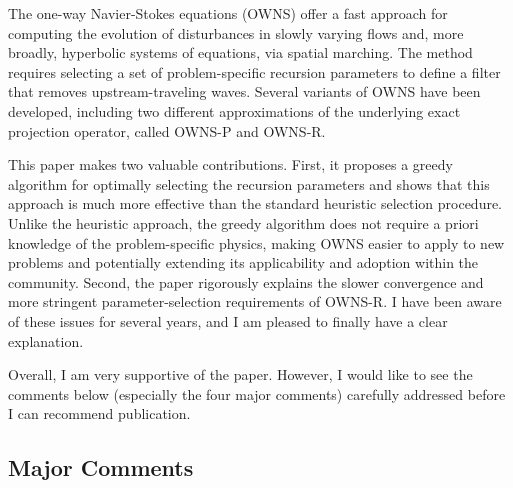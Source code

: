 \documentclass{article}
\begin{document}
The one-way Navier-Stokes equations (OWNS) offer a fast approach for computing the evolution of disturbances in slowly varying flows and, more broadly, hyperbolic systems of equations, via spatial marching. The method requires selecting a set of problem-specific recursion parameters to define a filter that removes upstream-traveling waves. Several variants of OWNS have been developed, including two different approximations of the underlying exact projection operator, called OWNS-P and OWNS-R.

This paper makes two valuable contributions. First, it proposes a greedy algorithm for optimally selecting the recursion parameters and shows that this approach is much more effective than the standard heuristic selection procedure. Unlike the heuristic approach, the greedy algorithm does not require a priori knowledge of the problem-specific physics, making OWNS easier to apply to new problems and potentially extending its applicability and adoption within the community. Second, the paper rigorously explains the slower convergence and more stringent parameter-selection requirements of OWNS-R. I have been aware of these issues for several years, and I am pleased to finally have a clear explanation.

Overall, I am very supportive of the paper. However, I would like to see the comments below (especially the four major comments) carefully addressed before I can recommend publication.


\subsection*{Major Comments}
\end{document}
